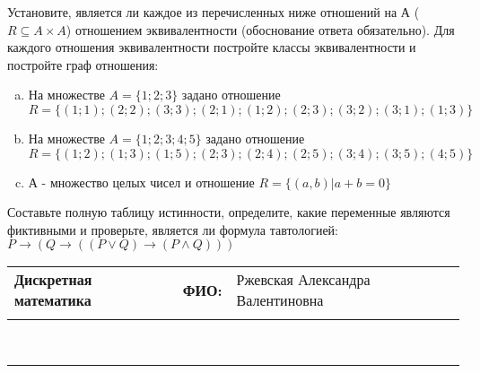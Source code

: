 \documentclass[10pt]{exam}
\newcommand{\class}{Дискретная математика}
\newcommand{\examdate}{}
\begin{document}
\begin{questions}
\question
Установите, является ли каждое из перечисленных ниже отношений на А ($R \subseteq A \times A$) отношением эквивалентности (обоснование ответа обязательно). Для каждого отношения эквивалентности постройте классы 
эквивалентности и постройте граф отношения:
\begin{enumerate} [a)]\setcounter{enumi}{0}
\item На множестве $A = \{1; 2; 3\}$ задано отношение $R = \{(1; 1); (2; 2); (3; 3); (2; 1); (1; 2); (2; 3); (3; 2); (3; 1); (1; 3)\}$
\item На множестве $A = \{1; 2; 3; 4; 5\}$ задано отношение $R = \{(1; 2); (1; 3); (1; 5); (2; 3); (2; 4); (2; 5); (3; 4); (3; 5); (4; 5)\}$
\item А - множество целых чисел и отношение $R = \{(a,b)|a + b = 0\}$
\end{enumerate}\question Составьте полную таблицу истинности, определите, какие переменные являются фиктивными и проверьте, является ли формула тавтологией:
$ P \rightarrow (Q \rightarrow ((P \lor Q) \rightarrow (P \land Q)))$

\end{questions}
\newpage
\begin{flushright}
\begin{tabular}{p{2.8in} r l}
\textbf{\class} & \textbf{ФИО:} &Ржевская Александра Валентиновна
\\

\textbf{\examdate} &&\\
\end{tabular}\\
\end{flushright}
\rule[1ex]{\textwidth}{.1pt}
\end{document}
